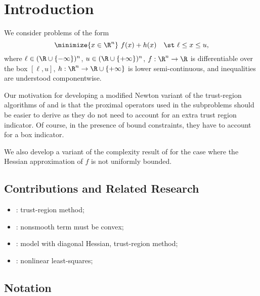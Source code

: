 \documentclass[smallextended]{svjour3}       %
\begin{document}
%

\section{Introduction}%
\label{sec:introduction}

We consider problems of the form
\begin{equation}%
  \label{eq:nlp}
  \minimize{x \in \R^n} \ f(x) + h(x) \quad \st \ \ell \leq x \leq u,
\end{equation}
where \(\ell \in (\R \cup \{-\infty\})^n\), \(u \in (\R \cup \{+\infty\})^n\), \(f: \R^n \to \R\) is differentiable over the box \([\ell, u]\), \(h: \R^n \to \R \cup \{+\infty\}\) is lower semi-continuous, and inequalities are understood componentwise.

Our motivation for developing a modified Newton variant of the trust-region algorithms of \citet{aravkin-baraldi-orban-2022} and \citet{leconte-orban-2023} is that the proximal operators used in the subproblems should be easier to derive as they do not need to account for an extra trust region indicator.
Of course, in the presence of bound constraints, they have to account for a box indicator.

We also develop a variant of the complexity result of \citet{leconte-orban-2023} for the case where the Hessian approximation of \(f\) is not uniformly bounded.

\subsection*{Contributions and Related Research}

\begin{itemize}
  \item \citet{aravkin-baraldi-orban-2022}: trust-region method;
  \item \citet{kanzow-lechner-2021}: nonsmooth term must be convex;
  \item \citet{leconte-orban-2023}: model with diagonal Hessian, trust-region method;
  \item \citet{aravkin-baraldi-orban-2022b}: nonlinear least-squares;
\end{itemize}

\subsection*{Notation}
\end{document}
